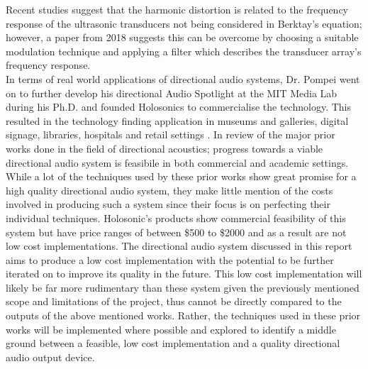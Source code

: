 Recent studies suggest that the harmonic distortion is related to the frequency response of the ultrasonic transducers not being considered in Berktay's equation; however, a paper from 2018 \cite{farias_abdulla_2018} suggests this can be overcome by choosing a suitable modulation technique and applying a filter which describes the transducer array's frequency response.\\
In terms of real world applications of directional audio systems, Dr. Pompei went on to further develop his directional Audio Spotlight at the MIT Media Lab during his Ph.D. and founded Holosonics to commercialise the technology. This resulted in the technology finding application in museums and galleries, digital signage, libraries, hospitals and retail settings \cite{holosonicsresearchlabs_2002}.
In review of the major prior works done in the field of directional acoustics; progress towards a viable directional audio system is feasibile in both commercial and academic settings. While a lot of the techniques used by these prior works show great promise for a high quality directional audio system, they make little mention of the costs involved in producing such a system since their focus is on perfecting their individual techniques. Holosonic's products show commercial feasibility of this system but have price ranges of between \$500 to \$2000 and as a result are not low cost implementations. The directional audio system discussed in this report aims to produce a low cost implementation with the potential to be further iterated on to improve its quality in the future. This low cost implementation will likely be far more rudimentary than these system given the previously mentioned scope and limitations of the project, thus cannot be directly compared to the outputs of the above mentioned works. Rather, the techniques used in these prior works will be implemented where possible and explored to identify a middle ground between a feasible, low cost implementation and a quality directional audio output device.